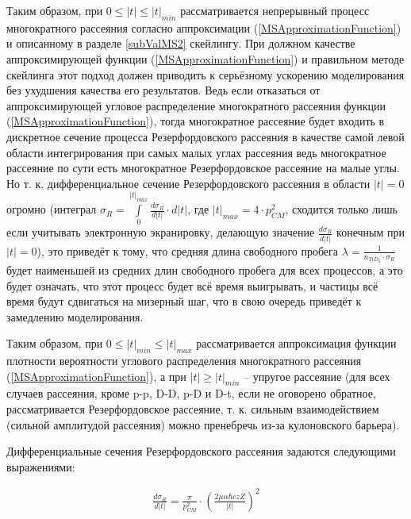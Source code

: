 \documentclass[a4paper,12pt]{article}
\begin{document}
\begin{large}
	Таким образом, при $0 \leq |t| \leq |t|_{min}$ рассматривается непрерывный процесс многократного рассеяния согласно аппроксимации (\ref{MSApproximationFunction}) и описанному в разделе \ref{subValMS2} скейлингу.
	При должном качестве аппроксимирующей функции (\ref{MSApproximationFunction}) и правильном методе скейлинга этот подход должен приводить к серьёзному ускорению моделирования без ухудшения качества его результатов.
	Ведь если отказаться от аппроксимирующей угловое распределение многократного рассеяния функции (\ref{MSApproximationFunction}), тогда многократное рассеяние будет входить в дискретное сечение процесса Резерфордовского рассеяния в качестве самой левой области интегрирования при самых малых углах рассеяния ведь многократное рассеяние по сути есть многократное Резерфордовское рассеяние на малые углы.
	Но т. к. дифференциальное сечение Резерфордовского рассеяния в области $|t|=0$ огромно (интеграл $\sigma_R=\int \limits_0^{|t|_{max}} \frac{d\sigma_R}{d|t|} \cdot d|t|$, где $|t|_{max}=4\cdot p^2_{CM}$, сходится только лишь если учитывать электронную экранировку, делающую значение $\frac{d\sigma_R}{d|t|}$ конечным при $|t|=0$), это приведёт к тому, что средняя длина свободного пробега $\lambda=\frac{1}{n_{TiD_2} \cdot \sigma_R}$ будет наименьшей из средних длин свободного пробега для всех процессов, а это будет означать, что этот процесс будет всё время выигрывать, и частицы всё время будут сдвигаться на мизерный шаг, что в свою очередь приведёт к замедлению моделирования.
	
	Таким образом, при $0 \leq |t|_{min} \leq|t|_{max}$ рассматривается аппроксимация функции плотности вероятности углового распределения многократного рассеяния (\ref{MSApproximationFunction}), а при $|t| \geq |t|_{min}$ -- упругое рассеяние (для всех случаев рассеяния, кроме p-p, D-D, p-D и D-t, если не оговорено обратное, рассматривается Резерфордовское рассеяние, т. к. сильным взаимодействием (сильной амплитудой рассеяния) можно пренебречь из-за кулоновского барьера).
	
	Дифференциальные сечения Резерфордовского рассеяния задаются следующими выражениями:
	
\begin{equation}
\label{DifferentialRutherfordCSDifferentParticles}
\begin{aligned} 
  \frac{d \sigma_R}{d|t|} = \frac{\pi}{p^2_{CM}} \cdot \left( \frac{ 2 \mu \alpha \hbar c z Z}{|t|} \right)^2 
\end{aligned}
\end{equation}


\end{large}
\end{document}
